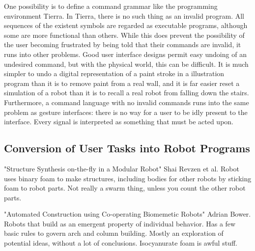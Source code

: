 \documentclass[]{article}
\begin{document}
One possibility is to define a command grammar like the programming environment Tierra. 
In Tierra, there is no such thing as an invalid program. 
All sequences of the existent symbols are regarded as executable programs, although some are more functional than others. 
While this does prevent the possibility of the user becoming frustrated by being told that their commands are invalid, it runs into other problems. 
Good user interface designs permit easy undoing of an undesired command, but with the physical world, this can be difficult. 
It is much simpler to undo a digital representation of a paint stroke in a illustration program than it is to remove paint from a real wall, and it is far easier reset a simulation of a robot than it is to recall a real robot from falling down the stairs. 
Furthermore, a command language with no invalid commands runs into the same problem as gesture interfaces: there is no way for a user to be idly present to the interface.
Every signal is interpreted as something that must be acted upon. 
\subsection{Conversion of User Tasks into Robot Programs} 

"Structure Synthesis on-the-fly in a Modular Robot" \cite{revzen2011structure} Shai Revzen et al. Robot uses binary foam to make structures, including bodies for other robots by sticking foam to robot parts. Not really a swarm thing, unless you count the other robot parts.  

"Automated Construction using Co-operating Biomemetic Robots" \cite{bowyer2000automated} Adrian Bower. Robots that build as an emergent property of individual behavior. Has a few basic rules to govern arch and column building. Mostly an exploration of potential ideas, without a lot of conclusions. Isocyanurate foam is awful stuff. 
\end{document}
